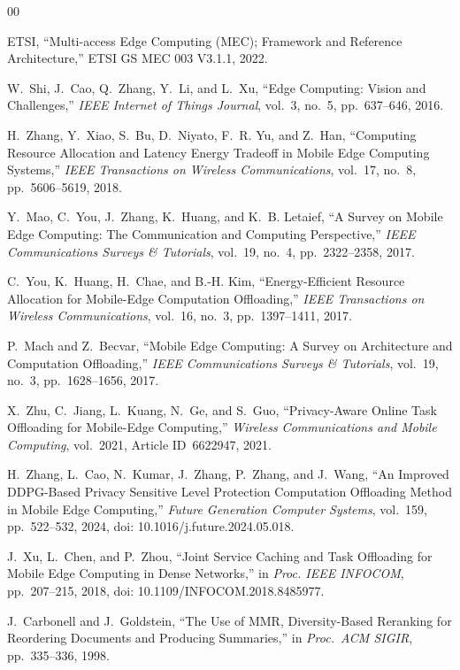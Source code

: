 \documentclass[conference]{IEEEtran}
\begin{document}
\balance
\begin{thebibliography}{00}

ETSI, ``Multi-access Edge Computing (MEC); Framework and Reference Architecture,'' ETSI GS MEC 003 V3.1.1, 2022.

W.~Shi, J.~Cao, Q.~Zhang, Y.~Li, and L.~Xu, ``Edge Computing: Vision and Challenges,'' \textit{IEEE Internet of Things Journal}, vol.~3, no.~5, pp.~637--646, 2016.

H.~Zhang, Y.~Xiao, S.~Bu, D.~Niyato, F.~R. Yu, and Z.~Han, ``Computing Resource Allocation and Latency Energy Tradeoff in Mobile Edge Computing Systems,'' \textit{IEEE Transactions on Wireless Communications}, vol.~17, no.~8, pp.~5606--5619, 2018.

Y.~Mao, C.~You, J.~Zhang, K.~Huang, and K.~B. Letaief, ``A Survey on Mobile Edge Computing: The Communication and Computing Perspective,'' \textit{IEEE Communications Surveys \& Tutorials}, vol.~19, no.~4, pp.~2322--2358, 2017.

C.~You, K.~Huang, H.~Chae, and B.-H. Kim, ``Energy-Efficient Resource Allocation for Mobile-Edge Computation Offloading,'' \textit{IEEE Transactions on Wireless Communications}, vol.~16, no.~3, pp.~1397--1411, 2017.

P.~Mach and Z.~Becvar, ``Mobile Edge Computing: A Survey on Architecture and Computation Offloading,'' \textit{IEEE Communications Surveys \& Tutorials}, vol.~19, no.~3, pp.~1628--1656, 2017.

X.~Zhu, C.~Jiang, L.~Kuang, N.~Ge, and S.~Guo, ``Privacy-Aware Online Task Offloading for Mobile-Edge Computing,'' \textit{Wireless Communications and Mobile Computing}, vol.~2021, Article ID~6622947, 2021.

H.~Zhang, L.~Cao, N.~Kumar, J.~Zhang, P.~Zhang, and J.~Wang, ``An Improved DDPG-Based Privacy Sensitive Level Protection Computation Offloading Method in Mobile Edge Computing,'' \textit{Future Generation Computer Systems}, vol.~159, pp.~522--532, 2024, doi: 10.1016/j.future.2024.05.018.

J.~Xu, L.~Chen, and P.~Zhou, ``Joint Service Caching and Task Offloading for Mobile Edge Computing in Dense Networks,'' in \textit{Proc. IEEE INFOCOM}, pp.~207--215, 2018, doi: 10.1109/INFOCOM.2018.8485977.

J.~Carbonell and J.~Goldstein, ``The Use of MMR, Diversity-Based Reranking for Reordering Documents and Producing Summaries,'' in \textit{Proc.\ ACM SIGIR}, pp.~335--336, 1998.


\end{thebibliography}
\end{document}
